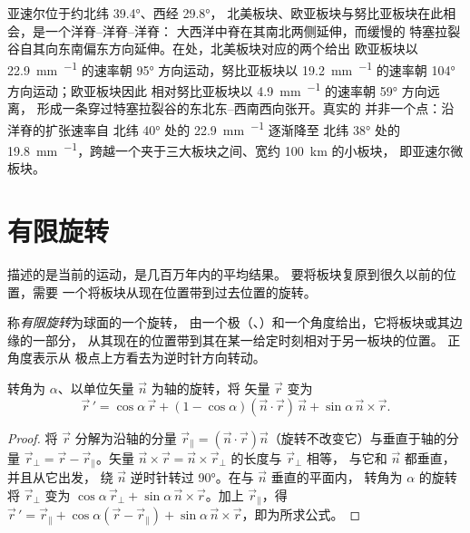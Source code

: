亚速尔位于约北纬 \ang{39.4}、西经 \ang{29.8}，
北美板块、欧亚板块与努比亚板块在此相会，是一个洋脊–洋脊–洋脊：
大西洋中脊在其南北两侧延伸，而缓慢的
特塞拉裂谷自其向东南偏东方向延伸。在处，北美板块对应的两个给出
欧亚板块以 \qty{22.9}{mm.^{-1}} 的速率朝
\ang{95} 方向运动，努比亚板块以 \qty{19.2}{mm.^{-1}} 的速率朝 \ang{104} 方向运动；欧亚板块因此
相对努比亚板块以 \qty{4.9}{mm.^{-1}} 的速率朝 \ang{59} 方向远离，
形成一条穿过特塞拉裂谷的东北东–西南西向张开。真实的
并非一个点：沿洋脊的扩张速率自
北纬 \ang{40} 处的 \qty{22.9}{mm.^{-1}} 逐渐降至
北纬 \ang{38} 处的 \qty{19.8}{mm.^{-1}}，跨越一个夹于三大板块之间、宽约 \qty{100}{km} 的小板块，
即亚速尔微板块。

\section{有限旋转}

描述的是当前的运动，是几百万年内的平均结果。
要将板块复原到很久以前的位置，需要
一个将板块从现在位置带到过去位置的旋转。

\begin{definition}[有限旋转]\label{def:b1:plate-kinematics:finite-rotation}
称\emph{有限旋转}为球面的一个旋转，
由一个极（、）和一个角度给出，它将板块或其边缘的一部分，
从其现在的位置带到其在某一给定时刻相对于另一板块的位置。
正角度表示从
极点上方看去为逆时针方向转动。
\end{definition}

\begin{proposition}[罗德里格斯公式]\label{prop:b1:plate-kinematics:rodrigues}
转角为 $\alpha$、以单位矢量 $\vec n$ 为轴的旋转，将
矢量 $\vec r$ 变为
\[
  \vec r\,' = \cos\alpha\,\vec r + (1 - \cos\alpha)(\vec n\cdot\vec r)\,\vec n
  + \sin\alpha\,\vec n\times\vec r .
\]
\end{proposition}

\begin{proof}
将 $\vec r$ 分解为沿轴的分量 $\vec r_\parallel =
(\vec n\cdot\vec r)\vec n$（旋转不改变它）与垂直于轴的分量
$\vec r_\perp = \vec r - \vec r_\parallel$。矢量
$\vec n\times\vec r = \vec n\times\vec r_\perp$ 的长度与 $\vec r_\perp$ 相等，
与它和 $\vec n$ 都垂直，并且从它出发，
绕 $\vec n$ 逆时针转过 \ang{90}。在与 $\vec n$ 垂直的平面内，
转角为 $\alpha$ 的旋转将 $\vec r_\perp$ 变为 $\cos\alpha\,\vec r_\perp +
\sin\alpha\,\vec n\times\vec r$。加上 $\vec r_\parallel$，得 $\vec r\,' =
\vec r_\parallel + \cos\alpha(\vec r - \vec r_\parallel) + \sin\alpha\,
\vec n\times\vec r$，即为所求公式。
\end{proof}

